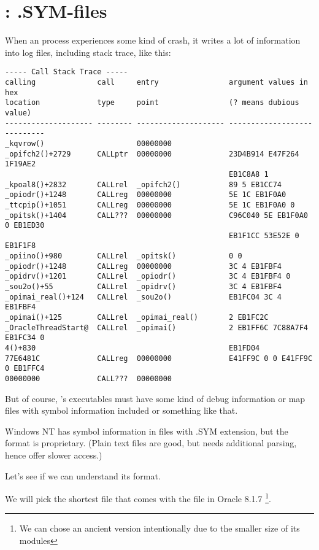 \section{\oracle: .SYM-files}
\myindex{\oracle}
\label{Oracle_SYM_files_example}

When an \oracle process experiences some kind of crash, it writes a lot of information into log files,
including stack trace, like this:

\begin{lstlisting}
----- Call Stack Trace -----
calling              call     entry                argument values in hex      
location             type     point                (? means dubious value)     
-------------------- -------- -------------------- ----------------------------
_kqvrow()                     00000000             
_opifch2()+2729      CALLptr  00000000             23D4B914 E47F264 1F19AE2
                                                   EB1C8A8 1
_kpoal8()+2832       CALLrel  _opifch2()           89 5 EB1CC74
_opiodr()+1248       CALLreg  00000000             5E 1C EB1F0A0
_ttcpip()+1051       CALLreg  00000000             5E 1C EB1F0A0 0
_opitsk()+1404       CALL???  00000000             C96C040 5E EB1F0A0 0 EB1ED30
                                                   EB1F1CC 53E52E 0 EB1F1F8
_opiino()+980        CALLrel  _opitsk()            0 0
_opiodr()+1248       CALLreg  00000000             3C 4 EB1FBF4
_opidrv()+1201       CALLrel  _opiodr()            3C 4 EB1FBF4 0
_sou2o()+55          CALLrel  _opidrv()            3C 4 EB1FBF4
_opimai_real()+124   CALLrel  _sou2o()             EB1FC04 3C 4 EB1FBF4
_opimai()+125        CALLrel  _opimai_real()       2 EB1FC2C
_OracleThreadStart@  CALLrel  _opimai()            2 EB1FF6C 7C88A7F4 EB1FC34 0
4()+830                                            EB1FD04
77E6481C             CALLreg  00000000             E41FF9C 0 0 E41FF9C 0 EB1FFC4
00000000             CALL???  00000000             
\end{lstlisting}

But of course, \oracle's executables must have some kind of debug information or map files with symbol
information included or something like that.

Windows NT \oracle has symbol information in files with .SYM extension, but the format is proprietary.
(Plain text files are good, but needs additional parsing, hence offer slower access.)

Let's see if we can understand its format.

We will pick the shortest  file that comes with the  file in Oracle 8.1.7
\footnote{We can chose an ancient \oracle version intentionally due to the smaller size of its modules}.

